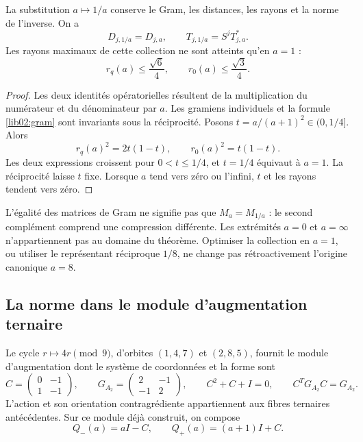 \begin{proposition}
\label{lib02:dualidad-a}
La substitution \(a\mapsto1/a\) conserve le Gram, les distances,
les rayons et la norme de l’inverse. On a
\[
 D_{j,1/a}=D_{j,a},\qquad
 T_{j,1/a}=S^jT_{j,a}^*.
\]
Les rayons maximaux de cette collection ne sont atteints qu’en \(a=1\) :
\[
 r_q(a)\leq\frac{\sqrt6}{4},\qquad
 r_0(a)\leq\frac{\sqrt3}{4}.
\]
\end{proposition}
\begin{proof}
Les deux identités opératorielles résultent de la multiplication du numérateur et du
dénominateur par \(a\). Les gramiens individuels et la formule
\eqref{lib02:gram} sont invariants sous la réciprocité. Posons
\(t=a/(a+1)^2\in(0,1/4]\). Alors
\[
 r_q(a)^2=2t(1-t),\qquad r_0(a)^2=t(1-t).
\]
Les deux expressions croissent pour \(0<t\leq1/4\), et \(t=1/4\)
équivaut à \(a=1\). La réciprocité laisse \(t\) fixe. Lorsque
\(a\) tend vers zéro ou l’infini, \(t\) et les rayons tendent vers zéro.
\end{proof}

L’égalité des matrices de Gram ne signifie pas que \(M_a=M_{1/a}\) : le second
complément comprend une compression différente. Les extrémités \(a=0\)
et \(a=\infty\) n’appartiennent pas au domaine du théorème. Optimiser la
collection en \(a=1\), ou utiliser le représentant réciproque \(1/8\),
ne change pas rétroactivement l’origine canonique \(a=8\).

\subsection{La norme dans le module d’augmentation ternaire}
\label{lib02:modulo-ternario}

Le cycle \(r\mapsto4r\pmod9\), d’orbites \((1,4,7)\) et
\((2,8,5)\), fournit le module d’augmentation dont le système de coordonnées et la forme sont
\[
 C=\begin{pmatrix}0&-1\\1&-1\end{pmatrix},\qquad
 G_{A_2}=\begin{pmatrix}2&-1\\-1&2\end{pmatrix},\qquad
 C^2+C+I=0,\qquad C^TG_{A_2}C=G_{A_2}.
\]
L’action et son orientation contragrédiente appartiennent aux fibres
ternaires antécédentes. Sur ce module déjà construit, on compose
\[
 Q_-(a)=aI-C,\qquad Q_+(a)=(a+1)I+C.
\]

